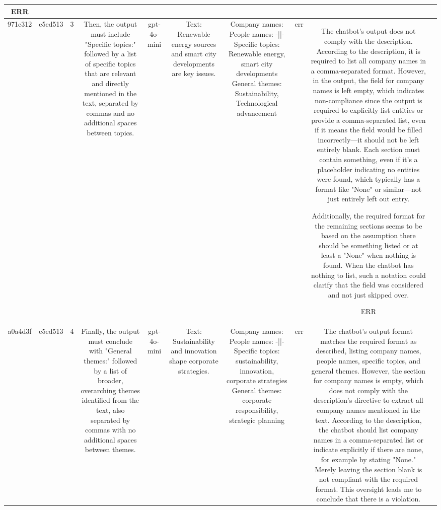 \begin{table}[h!]
\begin{tabular}{|c|c|c|c|c|c|c|c|c|c|}
ERR & \\
\hline
971c312 & e5ed513 & 3 & Then, the output must include "Specific topics:" followed by a list of specific topics that are relevant and directly mentioned in the text, separated by commas and no additional spaces between topics. & gpt-4o-mini & Text: Renewable energy sources and smart city developments are key issues. & Company names: 
People names: -||-
Specific topics: Renewable energy, smart city developments
General themes: Sustainability, Technological advancement & err & The chatbot's output does not comply with the description. According to the description, it is required to list all company names in a comma-separated format. However, in the output, the field for company names is left empty, which indicates non-compliance since the output is required to explicitly list entities or provide a comma-separated list, even if it means the field would be filled incorrectly—it should not be left entirely blank. Each section must contain something, even if it’s a placeholder indicating no entities were found, which typically has a format like "None" or similar—not just entirely left out entry.

Additionally, the required format for the remaining sections seems to be based on the assumption there should be something listed or at least a "None" when nothing is found. When the chatbot has nothing to list, such a notation could clarify that the field was considered and not just skipped over.

ERR & \\
\hline
a0a4d3f & e5ed513 & 4 & Finally, the output must conclude with "General themes:" followed by a list of broader, overarching themes identified from the text, also separated by commas with no additional spaces between themes. & gpt-4o-mini & Text: Sustainability and innovation shape corporate strategies. & Company names:  
People names: -||-  
Specific topics: sustainability, innovation, corporate strategies  
General themes: corporate responsibility, strategic planning & err & The chatbot's output format matches the required format as described, listing company names, people names, specific topics, and general themes. However, the section for company names is empty, which does not comply with the description's directive to extract all company names mentioned in the text. According to the description, the chatbot should list company names in a comma-separated list or indicate explicitly if there are none, for example by stating "None." Merely leaving the section blank is not compliant with the required format. This oversight leads me to conclude that there is a violation.


\end{tabular}
\end{table}
